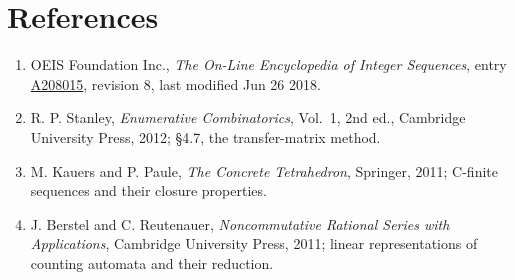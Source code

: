\documentclass[11pt]{article}
\theoremstyle{definition}
\begin{document}
\section{References}

\begin{enumerate}

\item OEIS Foundation Inc., \emph{The On-Line Encyclopedia of Integer Sequences}, entry \href{https://oeis.org/A208015}{A208015}, revision 8, last modified Jun 26 2018.

\item R. P. Stanley, \emph{Enumerative Combinatorics}, Vol.~1, 2nd ed., Cambridge University Press, 2012; \S4.7, the transfer-matrix method.

\item M. Kauers and P. Paule, \emph{The Concrete Tetrahedron}, Springer, 2011; C-finite sequences and their closure properties.

\item J. Berstel and C. Reutenauer, \emph{Noncommutative Rational Series with Applications}, Cambridge University Press, 2011; linear representations of counting automata and their reduction.

\end{enumerate}
\end{document}
